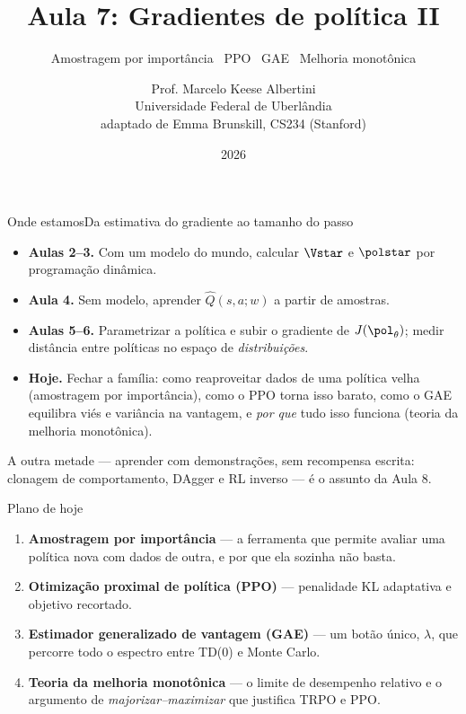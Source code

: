 \documentclass[aspectratio=169, 10pt]{beamer}
\title[Aula 7 — PPO e GAE]{Aula 7: Gradientes de política II}
\subtitle[Aprendizagem por Reforço]{Amostragem por importância \textbullet\ PPO \textbullet\ GAE \textbullet\ Melhoria monotônica}
\author[Prof. Marcelo K. Albertini]{Prof. Marcelo Keese Albertini \\
  \footnotesize Universidade Federal de Uberlândia \\
  \footnotesize adaptado de Emma Brunskill, CS234 (Stanford)}
\institute{Universidade Federal de Uberlândia}
\date{2026}
\newcommand{\thv}{\theta}
\newcommand{\polth}{\pol_{\thv}}
\newcommand{\Qhat}{\hat{Q}}
\begin{document}
\begin{frame}\titlepage\end{frame}

\begin{frame}{Onde estamos}{Da estimativa do gradiente ao tamanho do passo}

  \begin{itemize}\setlength{\itemsep}{0.45ex}
    \item \textbf{Aulas 2--3.} Com um modelo do mundo, calcular $\Vstar$ e $\polstar$
      por programação dinâmica.
    \item \textbf{Aula 4.} Sem modelo, aprender $\Qhat(s,a;w)$ a partir de amostras.
    \item \textbf{Aulas 5--6.} Parametrizar a política e subir o gradiente de
      $J(\polth)$; medir distância entre políticas no espaço de \emph{distribuições}.
    \item \textbf{Hoje.} Fechar a família: como reaproveitar dados de uma política
      velha (\alert{amostragem por importância}), como o \alert{PPO} torna isso
      barato, como o \alert{GAE} equilibra viés e variância na vantagem, e
      \emph{por que} tudo isso funciona (teoria da melhoria monotônica).
  \end{itemize}

  \begin{ideiabox}
    A outra metade --- aprender com \alert{demonstrações}, sem recompensa escrita:
    clonagem de comportamento, DAgger e RL inverso --- é o assunto da Aula 8.
  \end{ideiabox}
\end{frame}

\begin{frame}{Plano de hoje}

  \begin{enumerate}\setlength{\itemsep}{0.5ex}
    \item \textbf{Amostragem por importância} --- a ferramenta que permite avaliar
      uma política nova com dados de outra, e por que ela sozinha não basta.
    \item \textbf{Otimização proximal de política (PPO)} --- penalidade KL adaptativa
      e objetivo recortado.
    \item \textbf{Estimador generalizado de vantagem (GAE)} --- um botão único,
      $\lambda$, que percorre todo o espectro entre TD(0) e Monte Carlo.
    \item \textbf{Teoria da melhoria monotônica} --- o limite de desempenho relativo
      e o argumento de \emph{majorizar--maximizar} que justifica TRPO e PPO.
  \end{enumerate}
\end{frame}
\end{document}
